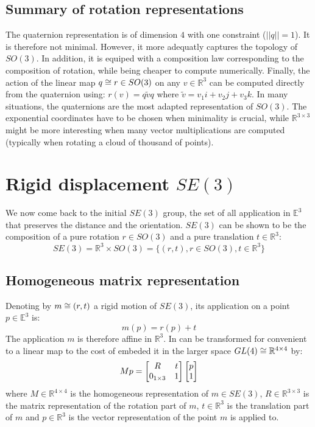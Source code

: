 \documentclass{book}
\begin{document}
\subsection{Summary of rotation representations}
The quaternion representation is of dimension $4$ with one constraint ($||q||=1$). It is therefore not minimal. However, it more adequatly captures the topology of $SO(3)$. In addition, it is equiped with a composition law corresponding to the composition of rotation, while being cheaper to compute numerically. Finally, the action of the linear map $q \cong r \in SO(3)$ on any $v \in \mathbb{R}^3$ can be computed directly from the quaternion using:
$ r(v) = q \tilde{v} q  $
where $\tilde v = v_1 i + v_2 j + v_3 k$. In many situations, the quaternions are the most adapted representation of $SO(3)$. The exponential coordinates have to be chosen when minimality is crucial, while $\mathbb{R}^{3\times3}$ might be more interesting when many vector multiplications are computed (typically when rotating a cloud of thousand of points).

\section{Rigid displacement $SE(3)$}

We now come back to the initial $SE(3)$ group, the set of all application in $\mathbb{E}^3$ that preserves the distance and the orientation. $SE(3)$ can be shown to be the composition of a pure rotation $r \in SO(3)$ and a pure translation $t \in \mathbb{R}^3$:
\[ SE(3) = \mathbb{R}^3 \times SO(3) = \{ (r,t), r\in SO(3), t \in \mathbb{R}^3 \} \]

\subsection{Homogeneous matrix representation}
Denoting by $m \cong (r,t)$ a rigid motion of $SE(3)$, its application on a point $p \in \mathbb{E}^3$ is:
\[ m(p) = r(p) + t \]
The application $m$ is therefore affine in $\mathbb{R}^3$. In can be transformed for convenient to a linear map to the cost of embeded it in the larger space $GL(4) \cong \mathbb{R}^{4\times4}$ by:
\[ M p = \begin{bmatrix} R & t \\ 0_{1\times3} & 1 \end{bmatrix} \begin{bmatrix} p \\ 1 \end{bmatrix} \]
where $M \in \mathbb{R}^{4\times4}$ is the homogeneous representation of $m \in SE(3)$, $R \in  \mathbb{R}^{3\times3}$ is the matrix representation of the rotation part of $m$, $t \in \mathbb{R}^3$ is the translation part of $m$ and $p \in \mathbb{R}^3$ is the vector representation of the point $m$ is applied to.
\end{document}
